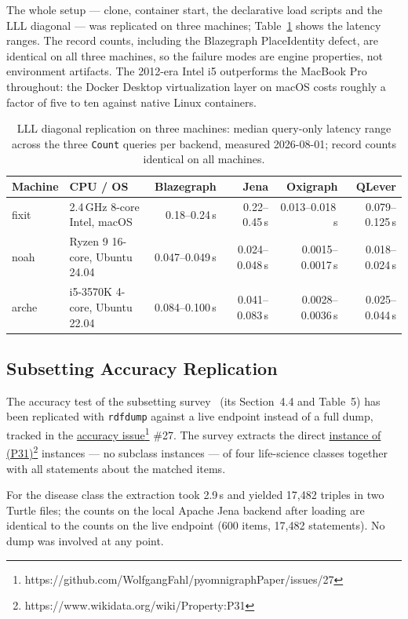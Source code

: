 \documentclass[
]{ceurart}
\newcommand{\footnotelink}[2]{\href{#1}{#2}\footnote{#1}}
\newcommand{\wdp}[2]{\footnotelink{https://www.wikidata.org/wiki/Property:#2}{#1 (#2)}}
\begin{document}
The whole setup --- clone, container start, the declarative load scripts and the LLL diagonal --- was replicated on three machines; Table~\ref{tab:machines} shows the latency ranges. The record counts, including the Blazegraph PlaceIdentity defect, are identical on all three machines, so the failure modes are engine properties, not environment artifacts. The 2012-era Intel i5 outperforms the MacBook Pro throughout: the Docker Desktop virtualization layer on macOS costs roughly a factor of five to ten against native Linux containers.

\begin{table}
\caption{LLL diagonal replication on three machines: median query-only
latency range across the three \texttt{Count} queries per backend,
measured 2026-08-01; record counts identical on all machines.}
\label{tab:machines}
\begin{tabular}{llrrrr}
\hline
Machine & CPU / OS & Blazegraph & Jena & Oxigraph & QLever \\
\hline
fixit & 2.4\,GHz 8-core Intel, macOS & 0.18--0.24\,s & 0.22--0.45\,s & 0.013--0.018\,s & 0.079--0.125\,s \\
noah  & Ryzen 9 16-core, Ubuntu 24.04 & 0.047--0.049\,s & 0.024--0.048\,s & 0.0015--0.0017\,s & 0.018--0.024\,s \\
arche & i5-3570K 4-core, Ubuntu 22.04 & 0.084--0.100\,s & 0.041--0.083\,s & 0.0028--0.0036\,s & 0.025--0.044\,s \\
\hline
\end{tabular}
\end{table}

\subsection{Subsetting Accuracy Replication}\label{sec:accuracy}
The accuracy test of the subsetting survey~\cite{hosseini2023subsetting}
(its Section~4.4 and Table~5) has been replicated with \texttt{rdfdump}
against a live endpoint instead of a full dump, tracked in the
\footnotelink{https://github.com/WolfgangFahl/pyomnigraphPaper/issues/27}{accuracy issue}
\#27. The survey extracts the direct \wdp{instance of}{P31} instances ---
no subclass instances --- of four life-science classes together with all
statements about the matched items.

For the disease class the extraction took 2.9\,s and yielded 17{,}482
triples in two Turtle files; the counts on the local Apache Jena backend
after loading are identical to the counts on the live endpoint
(600 items, 17{,}482 statements). No dump was involved at any point.
\end{document}
